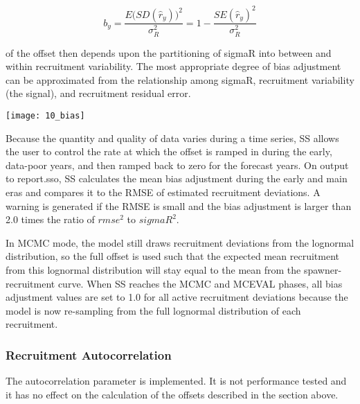 \begin{equation}
	b_y=\frac{E\Big( SD(\hat{r}_y)\Big)^2}{\sigma^2_R}=1-\frac{SE(\hat{r}_y)^2}{\sigma^2_R}
\end{equation}

\noindent of the offset then depends upon the partitioning of sigmaR into between and within recruitment variability.  The most appropriate degree of bias adjustment can be approximated from the relationship among sigmaR, recruitment variability (the signal), and recruitment residual error.

\begin{center}
	\texttt{[image: 10\_bias]}
\end{center}

Because the quantity and quality of data varies during a time series, SS allows the user to control the rate at which the offset is ramped in during the early, data-poor years, and then ramped back to zero for the forecast years.
On output to report.sso, SS calculates the mean bias adjustment during the early and main eras and compares it to the RMSE of estimated recruitment deviations.  A warning is generated if the RMSE is small and the bias adjustment is larger than 2.0 times the ratio of $rmse^2$ to $sigmaR^2$.

In MCMC mode, the model still draws recruitment deviations from the lognormal distribution, so the full offset is used such that the expected mean recruitment from this lognormal distribution will stay equal to the mean from the spawner-recruitment curve. When SS reaches the MCMC and MCEVAL phases, all bias adjustment values are set to 1.0 for all active recruitment deviations because the model is now re-sampling from the full lognormal distribution of each recruitment.

\subsubsection{Recruitment Autocorrelation}
The autocorrelation parameter is implemented.  It is not performance tested and it has no effect on the calculation of the offsets described in the section above.

